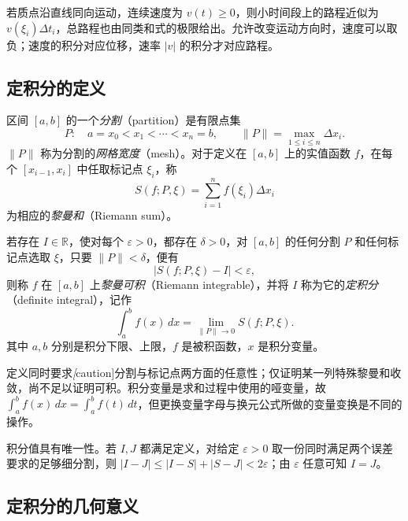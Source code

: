 \documentclass[UTF8,12pt,a4paper,fontset=fandol]{ctexbook}
\begin{document}
若质点沿直线同向运动，连续速度为 $v(t)\geq0$，则小时间段上的路程近似为 $v(\xi_i)\Delta t_i$，总路程也由同类和式的极限给出。允许改变运动方向时，速度可以取负；速度的积分对应位移，速率 $|v|$ 的积分才对应路程。

\subsection{定积分的定义}
\label{subsec:definition-of-definite-integrals}

\begin{definition}
\label{def:partition-and-riemann-sum}
区间 $[a,b]$ 的一个\emph{分割}（partition）是有限点集
\[
    P:\quad a=x_0<x_1<\cdots<x_n=b,
    \qquad \|P\|=\max_{1\leq i\leq n}\Delta x_i.
\]
$\|P\|$ 称为分割的\emph{网格宽度}（mesh）。对于定义在 $[a,b]$ 上的实值函数 $f$，在每个 $[x_{i-1},x_i]$ 中任取标记点 $\xi_i$，称
\[
    S(f;P,\xi)=\sum_{i=1}^n f(\xi_i)\Delta x_i
\]
为相应的\emph{黎曼和}（Riemann sum）。
\end{definition}

\begin{definition}
\label{def:riemann-definite-integral}
若存在 $I\in\mathbb R$，使对每个 $\varepsilon>0$，都存在 $\delta>0$，对 $[a,b]$ 的任何分割 $P$ 和任何标记点选取 $\xi$，只要 $\|P\|<\delta$，便有
\[
    |S(f;P,\xi)-I|<\varepsilon,
\]
则称 $f$ 在 $[a,b]$ 上\emph{黎曼可积}（Riemann integrable），并将 $I$ 称为它的\emph{定积分}（definite integral），记作
\begin{equation}
    \int_a^b f(x)\,dx=\lim_{\|P\|\to0}S(f;P,\xi).
    \label{eq:riemann-integral-definition}
\end{equation}
其中 $a,b$ 分别是积分下限、上限，$f$ 是被积函数，$x$ 是积分变量。
\end{definition}

定义同时要求\emph[caution]{分割与标记点两方面的任意性}；仅证明某一列特殊黎曼和收敛，尚不足以证明可积。积分变量是求和过程中使用的哑变量，故 $\int_a^b f(x)\,dx=\int_a^b f(t)\,dt$，但更换变量字母与换元公式所做的变量变换是不同的操作。

积分值具有唯一性。若 $I,J$ 都满足定义，对给定 $\varepsilon>0$ 取一份同时满足两个误差要求的足够细分割，则 $|I-J|\leq|I-S|+|S-J|<2\varepsilon$；由 $\varepsilon$ 任意可知 $I=J$。

\subsection{定积分的几何意义}
\label{subsec:geometric-meaning-of-definite-integrals}
\end{document}
